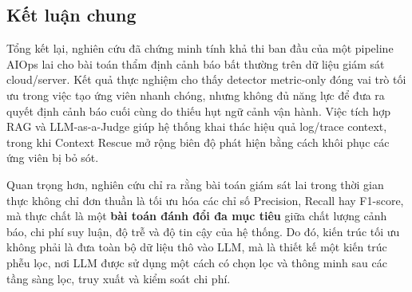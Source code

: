 \subsection{Kết luận chung}

Tổng kết lại, nghiên cứu đã chứng minh tính khả thi ban đầu của một pipeline AIOps lai cho bài toán thẩm định cảnh báo bất thường trên dữ liệu giám sát cloud/server. Kết quả thực nghiệm cho thấy detector metric-only đóng vai trò tối ưu trong việc tạo ứng viên nhanh chóng, nhưng không đủ năng lực để đưa ra quyết định cảnh báo cuối cùng do thiếu hụt ngữ cảnh vận hành. Việc tích hợp RAG và LLM-as-a-Judge giúp hệ thống khai thác hiệu quả log/trace context, trong khi Context Rescue mở rộng biên độ phát hiện bằng cách khôi phục các ứng viên bị bỏ sót.

Quan trọng hơn, nghiên cứu chỉ ra rằng bài toán giám sát lai trong thời gian thực không chỉ đơn thuần là tối ưu hóa các chỉ số Precision, Recall hay F1-score, mà thực chất là một \textbf{bài toán đánh đổi đa mục tiêu} giữa chất lượng cảnh báo, chi phí suy luận, độ trễ và độ tin cậy của hệ thống. Do đó, kiến trúc tối ưu không phải là đưa toàn bộ dữ liệu thô vào LLM, mà là thiết kế một kiến trúc phễu lọc, nơi LLM được sử dụng một cách có chọn lọc và thông minh sau các tầng sàng lọc, truy xuất và kiểm soát chi phí.

